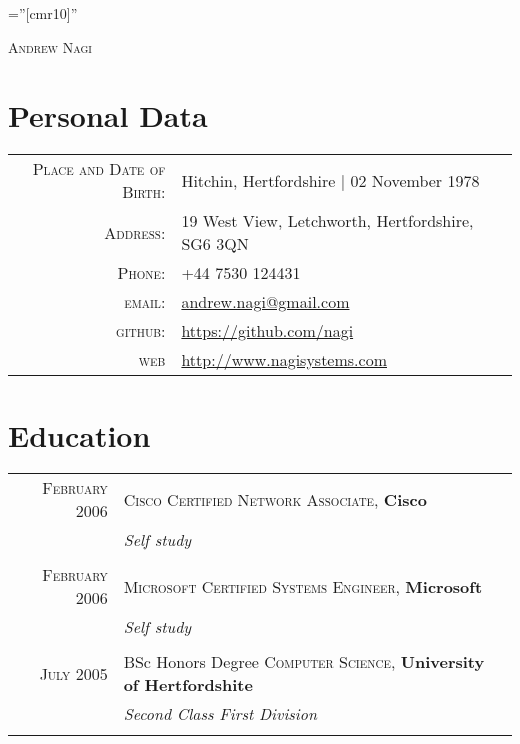 \documentclass[a4paper,11pt]{article}
\begin{document}

\pagestyle{empty} %

\font\fb=''[cmr10]'' %

\par{\centering
  {\huge \textsc{Andrew Nagi}
}\bigskip\par}
\section{Personal Data}

\begin{tabular}{rl}
  \textsc{Place and Date of Birth:} & Hitchin, Hertfordshire  | 02 November 1978 \\
  \textsc{Address:}   & 19 West View, Letchworth, Hertfordshire, SG6 3QN \\
  \textsc{Phone:}     & +44 7530 124431\\
  \textsc{email:}     & \href{mailto:andrew.nagi@gmail.com}{andrew.nagi@gmail.com} \\
  \textsc{github:}     & \href{https://github.com/nagi}{https://github.com/nagi} \\
  \textsc{web}     & \href{http://www.nagisystems.com}{http://www.nagisystems.com}
\end{tabular}

\section{Education}
\begin{tabular}{rl}	
  \textsc{February} 2006 & \textsc{Cisco Certified Network Associate}, \textbf{Cisco}\\
                         & \small\emph{Self study}\\&\\
  \textsc{February} 2006 & \textsc{Microsoft Certified Systems Engineer}, \textbf{Microsoft}\\
                         & \small\emph{Self study}\\&\\
  \textsc{July} 2005 & BSc Honors Degree \textsc{Computer Science}, \textbf{University of Hertfordshite}\\
                     & \small\emph{Second Class First Division}\\&\\
\end{tabular}
\end{document}
